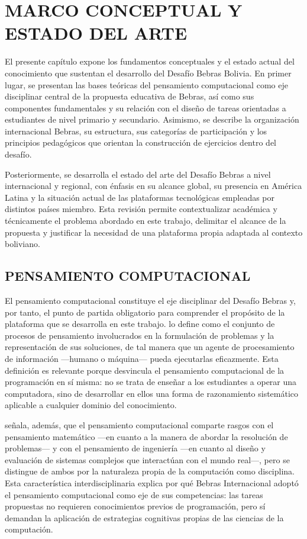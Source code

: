 \chapter{MARCO CONCEPTUAL Y ESTADO DEL ARTE}

El presente capítulo expone los fundamentos conceptuales y el estado actual del conocimiento que sustentan el desarrollo del Desafío Bebras Bolivia. En primer lugar, se presentan las bases teóricas del pensamiento computacional como eje disciplinar central de la propuesta educativa de Bebras, así como sus componentes fundamentales y su relación con el diseño de tareas orientadas a estudiantes de nivel primario y secundario. Asimismo, se describe la organización internacional Bebras, su estructura, sus categorías de participación y los principios pedagógicos que orientan la construcción de ejercicios dentro del desafío.

Posteriormente, se desarrolla el estado del arte del Desafío Bebras a nivel internacional y regional, con énfasis en su alcance global, su presencia en América Latina y la situación actual de las plataformas tecnológicas empleadas por distintos países miembro. Esta revisión permite contextualizar académica y técnicamente el problema abordado en este trabajo, delimitar el alcance de la propuesta y justificar la necesidad de una plataforma propia adaptada al contexto boliviano.

\section{PENSAMIENTO COMPUTACIONAL}

El pensamiento computacional constituye el eje disciplinar del Desafío Bebras y, por tanto, el punto de partida obligatorio para comprender el propósito de la plataforma que se desarrolla en este trabajo. \textcite[33]{wing2006} lo define como el conjunto de procesos de pensamiento involucrados en la formulación de problemas y la representación de sus soluciones, de tal manera que un agente de procesamiento de información —humano o máquina— pueda ejecutarlas eficazmente. Esta definición es relevante porque desvincula el pensamiento computacional de la programación en sí misma: no se trata de enseñar a los estudiantes a operar una computadora, sino de desarrollar en ellos una forma de razonamiento sistemático aplicable a cualquier dominio del conocimiento.

\textcite[35]{wing2006} señala, además, que el pensamiento computacional comparte rasgos con el pensamiento matemático —en cuanto a la manera de abordar la resolución de problemas— y con el pensamiento de ingeniería —en cuanto al diseño y evaluación de sistemas complejos que interactúan con el mundo real—, pero se distingue de ambos por la naturaleza propia de la computación como disciplina. Esta característica interdisciplinaria explica por qué Bebras Internacional adoptó el pensamiento computacional como eje de sus competencias: las tareas propuestas no requieren conocimientos previos de programación, pero sí demandan la aplicación de estrategias cognitivas propias de las ciencias de la computación.

